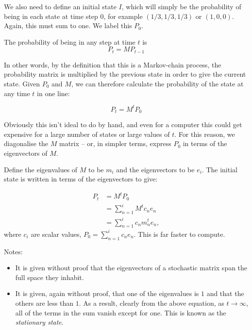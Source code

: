 \documentclass[12pt]{article}
\begin{document}
We also need to define an initial state $I$, which will simply be the probability of being in each state at time step $0$, for example $(1/3, 1/3, 1/3)$ or $(1, 0, 0)$. 
Again, this must sum to one.
We label this $P_0$.

The probability of being in any step at time $t$ is 
\begin{equation}
	P_{t} = MP_{t-1}
\end{equation}

In other words, by the definition that this is a Markov-chain process, the probability matrix is multiplied by the previous state in order to give the current state.
Given $P_0$ and $M$, we can therefore calculate the probability of the state at any time $t$ in one line:

\begin{equation}
	P_{t} = M^t P_{0}
\end{equation}

Obviously this isn't ideal to do by hand, and even for a computer this could get expensive for a large number of states or large values of $t$. For this reason, we diagonalise the $M$ matrix -- or, in simpler terms, express $P_0$ in terms of the eigenvectors of $M$. 

Define the eigenvalues of $M$ to be $m_i$ and the eigenvectors to be $e_i$. 
The initial state is written in terms of the eigenvectors to give:

\begin{equation}
	\begin{aligned}
		P_{t} &= M^t P_{0}\\
		&= \sum_{n=1}^{i} M^t c_n e_n\\
		&= \sum_{n=1}^{i} c_n m_n^t e_n,
	\end{aligned}
\end{equation}
where $c_i$ are scalar values, $P_{0} = \sum_{n=1}^{i} c_n e_n$.
This is far faster to compute.

Notes:
\begin{itemize}
	\item It is given without proof that the eigenvectors of a stochastic matrix span the full space they inhabit.
	\item It is given, again without proof, that one of the eigenvalues is $1$ and that the others are less than $1$. As a result, clearly from the above equation, as $t\rightarrow \infty$, all of the terms in the sum vanish except for one. This is known as the \emph{stationary state}.
\end{itemize}
\end{document}
